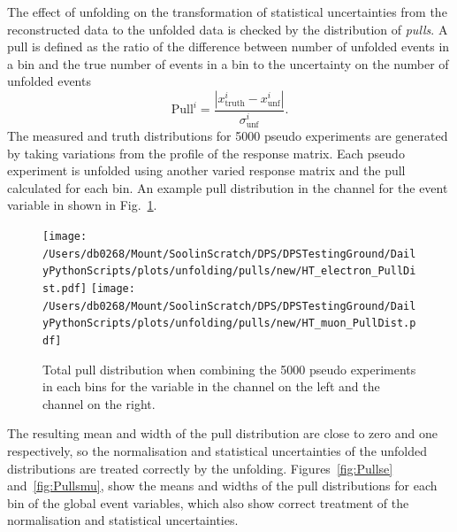 The effect of unfolding on the transformation of statistical uncertainties from the reconstructed data to the unfolded data is checked by the distribution of \textit{pulls}.
A pull is defined as the ratio of the difference between number of unfolded events in a bin and the true number of events in a bin to the uncertainty on the number of unfolded events
\begin{equation*}
\mathrm{Pull}^{i}=\frac{|x^{i}_{\mathrm{truth}}-x^{i}_{\mathrm{unf}}|}{\sigma^{i}_{\mathrm{unf}}}.
\end{equation*}
The measured and truth distributions for 5000 pseudo experiments are generated by taking variations from the profile of the \powhegpythia{} response matrix.
Each pseudo experiment is unfolded using another varied response matrix and the pull calculated for each bin.
An example pull distribution in the \eJets{} channel for the \HT{} event variable in shown in Fig.~\ref{fig:pullExample}.
\begin{figure}[htpb]
	\centering
	\texttt{[image: /Users/db0268/Mount/SoolinScratch/DPS/DPSTestingGround/DailyPythonScripts/plots/unfolding/pulls/new/HT\_electron\_PullDist.pdf]}
	\texttt{[image: /Users/db0268/Mount/SoolinScratch/DPS/DPSTestingGround/DailyPythonScripts/plots/unfolding/pulls/new/HT\_muon\_PullDist.pdf]}
	\caption[Total pull distribution when combining the 5000 pseudo experiments in each bins for the \HT{} variable in the \eJets{} channel on the left and the \muJets{} channel on the right.]{Total pull distribution when combining the 5000 pseudo experiments in each bins for the \HT{} variable in the \eJets{} channel on the left and the \muJets{} channel on the right.}
	\label{fig:pullExample}
\end{figure}
The resulting mean and width of the pull distribution are close to zero and one respectively, so the normalisation and statistical uncertainties of the unfolded distributions are treated correctly by the unfolding.
Figures~\ref{fig:Pullse} and~\ref{fig:Pullsmu}, show the means and widths of the pull distributions for each bin of the global event variables, which also show correct treatment of the normalisation and statistical uncertainties.





